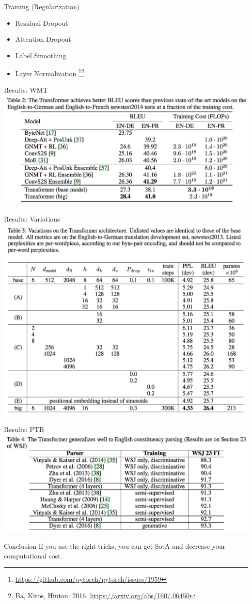 \documentclass{beamer}
\begin{document}
\begin{frame}{Training (Regularization)}{}
\begin{itemize}
\item Residual Dropout
\item Attention Dropout
\item Label Smoothing
\item Layer Normalization \footnote[frame]{\url{https://github.com/pytorch/pytorch/issues/1959}}\footnote[frame]{Ba, Kiros, Hinton. 2016. \url{https://arxiv.org/abs/1607.06450}}
\end{itemize}
\end{frame}
%

\begin{frame}{Results: WMT}{}
\centering
\includegraphics[width=\linewidth]{img/wmt.png}
\end{frame}
%

\begin{frame}{Results: Variations}{}
\centering
\includegraphics[width=0.8\linewidth]{img/variations.png}
\end{frame}
%

\begin{frame}{Results: PTB}{}
\centering
\includegraphics[width=\linewidth]{img/wsj.png}
\end{frame}
%

\begin{frame}{Conclusion}{}
If you use the right tricks, you can get SotA and decrease your computational cost.
\end{frame}
%
\end{document}
